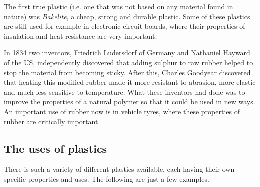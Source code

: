 \begin{IFact}{
The first true plastic (i.e. one that was not based on any material found in nature) was \textit{Bakelite}, a cheap, strong and durable plastic. Some of these plastics are still used for example in electronic circuit boards, where their properties of insulation and heat resistance are very important.}
\end{IFact}
In 1834 two inventors, Friedrich Ludersdorf of Germany and Nathaniel Hayward of the US, independently discovered that adding sulphur to raw rubber helped to stop the material from becoming sticky. After this, Charles Goodyear discovered that heating this modified rubber made it more resistant to abrasion, more elastic and much less sensitive to temperature. What these inventors had done was to improve the properties of a natural polymer so that it could be used in new ways. An important use of rubber now is in vehicle tyres, where these properties of rubber are critically important.


\subsection{The uses of plastics}

There is such a variety of different plastics available, each having their own specific properties and uses. The following are just a few examples.

